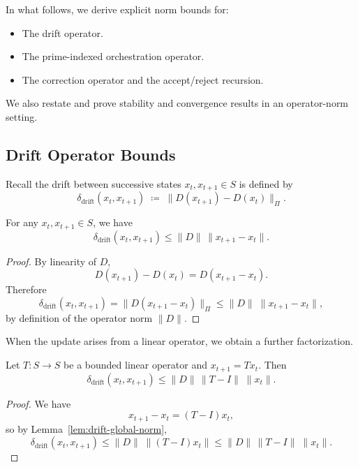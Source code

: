\documentclass[11pt]{article}
\begin{document}
In what follows, we derive explicit norm bounds for:
\begin{itemize}
  \item The drift operator.
  \item The prime-indexed orchestration operator.
  \item The correction operator and the accept/reject recursion.
\end{itemize}

We also restate and prove stability and convergence results in an operator-norm setting.

\subsection{Drift Operator Bounds}

Recall the drift between successive states \(x_t, x_{t+1} \in S\) is defined by
\[
  \delta_{\mathrm{drift}}(x_t, x_{t+1})
  \;\coloneqq\;
  \bigl\| D(x_{t+1}) - D(x_t) \bigr\|_{\Pi}.
\]

\begin{lemma}
\label{lem:drift-global-norm}
For any \(x_t, x_{t+1} \in S\), we have
\[
  \delta_{\mathrm{drift}}(x_t, x_{t+1})
  \le
  \|D\| \,\|x_{t+1} - x_t\|.
\]
\end{lemma}

\begin{proof}
By linearity of \(D\),
\[
  D(x_{t+1}) - D(x_t) = D(x_{t+1} - x_t).
\]
Therefore
\[
  \delta_{\mathrm{drift}}(x_t, x_{t+1})
  =
  \|D(x_{t+1} - x_t)\|_{\Pi}
  \le
  \|D\|\;\|x_{t+1} - x_t\|,
\]
by definition of the operator norm \(\|D\|\).
\end{proof}

When the update arises from a linear operator, we obtain a further factorization.

\begin{lemma}
\label{lem:drift-linear-update}
Let \(T : S \to S\) be a bounded linear operator and \(x_{t+1} = T x_t\). Then
\[
  \delta_{\mathrm{drift}}(x_t, x_{t+1})
  \le
  \|D\|\,\|T - I\|\;\|x_t\|.
\]
\end{lemma}

\begin{proof}
We have
\[
  x_{t+1} - x_t = (T - I)x_t,
\]
so by Lemma~\ref{lem:drift-global-norm},
\[
  \delta_{\mathrm{drift}}(x_t, x_{t+1})
  \le
  \|D\|\;\|(T - I)x_t\|
  \le
  \|D\|\,\|T - I\|\;\|x_t\|.
\]
\end{proof}
\end{document}
